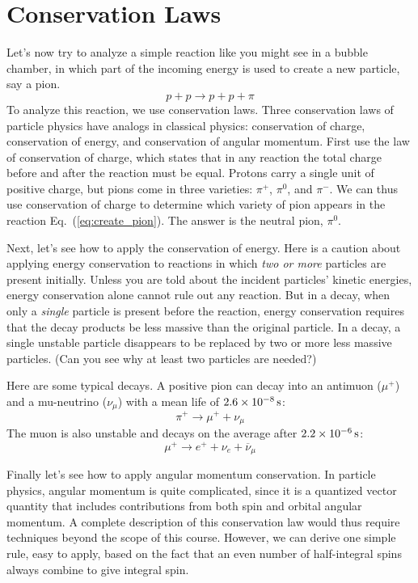 \section{Conservation Laws}

Let's now try to analyze a simple reaction like you might see in a
bubble chamber, in which part of the incoming energy is used to create
a new particle, say a pion.
\begin{equation}
p + p \to p + p + \pi
\label{eq:create_pion}
\end{equation}
To analyze this reaction, we use conservation laws.  Three
conservation laws of particle physics have analogs in classical
physics: conservation of charge, conservation of energy, and
conservation of angular momentum.  First use the law of
conservation of charge, which states that in any reaction the
total charge before and after the reaction must be equal.  Protons
carry a single unit of positive charge, but pions come in three
varieties: $\pi^+$, $\pi^0$, and $\pi^-$.  We can thus use
conservation of charge to determine which variety of pion appears
in the reaction Eq.~(\ref{eq:create_pion}).  The answer is the
neutral pion, $\pi^0$.

Next, let's see how to apply the conservation of energy.  Here is a
caution about applying energy conservation to reactions in which {\em
two or more} particles are present initially.  Unless you are told
about the incident particles' kinetic energies, energy conservation
alone cannot rule out any reaction.  But in a decay, when only a {\em
single} particle is present before the reaction, energy conservation
requires that the decay products be less massive than the original
particle.  In a decay, a single unstable particle disappears to be
replaced by two or more less massive particles.  (Can you see why at
least two particles are needed?)

Here are some typical decays.  A positive pion can decay into an
antimuon ($\mu^+$) and a mu-neutrino ($\nu_\mu$) with a mean life of
$2.6 \times 10^{-8}\,\mbox{s}$:
\begin{equation}
\pi^+ \to \mu^+ + \nu_\mu
\label{eq:pion_decay}
\end{equation}
The muon is also unstable and decays on the average after $2.2 \times
10^{-6}\,\mbox{s}$:
\begin{equation}
\mu^+ \to e^+ + \nu_e + \overline\nu_\mu
\label{eq:muon_decay}
\end{equation}

Finally let's see how to apply angular momentum conservation.  In
particle physics, angular momentum is quite complicated, since it is a
quantized vector quantity that includes contributions from both spin
and orbital angular momentum.  A complete description of this
conservation law would thus require techniques beyond the scope of
this course.  However, we can derive one simple rule, easy to apply,
based on the fact that an even number of half-integral spins always
combine to give integral spin.

